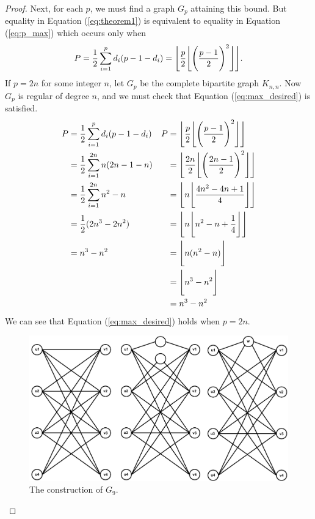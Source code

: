 \documentclass[10pt]{amsart}
\begin{document}
\begin{proof}
    Next, for each $p$, we must find a graph $G_p$ attaining this bound. But equality in Equation 
    (\ref{eq:theorem1}) is equivalent to equality in Equation (\ref{eq:p_max}) which occurs only 
    when
    \begin{equation}
        P = \frac{1}{2} \sum^{p}_{i=1}{d_i(p - 1 - d_i)} 
            = \Bigg \lfloor \frac{p}{2} \Bigg \lfloor  \Bigg \lparen  \frac{p - 1}{2}  \Bigg \rparen^2  \Bigg \rfloor \Bigg \rfloor. \label{eq:max_desired}
    \end{equation}
    If $p=2n$ for some integer $n$, let $G_p$ be the complete bipartite graph $K_{n,n}$. Now $G_p$ 
    is regular of degree $n$, and we must check that Equation (\ref{eq:max_desired}) is satisfied.
    \begin{align*}
        P &= \frac{1}{2} \sum^{p}_{i=1}{d_i(p - 1 - d_i)} & P &= \Bigg \lfloor \frac{p}{2} \Bigg \lfloor  \Bigg \lparen  \frac{p - 1}{2}  \Bigg \rparen^2  \Bigg \rfloor \Bigg \rfloor \notag \\
          &= \frac{1}{2} \sum^{2n}_{i=1}{n(2n - 1 - n)}   &   &= \Bigg \lfloor \frac{2n}{2} \Bigg \lfloor  \Bigg \lparen  \frac{2n - 1}{2}  \Bigg \rparen^2  \Bigg \rfloor \Bigg \rfloor \notag \\
          &= \frac{1}{2} \sum^{2n}_{i=1}{n^2 - n}         &   &= \Bigg \lfloor  n \Bigg \lfloor  \frac{4n^2 - 4n + 1}{4}  \Bigg \rfloor \Bigg \rfloor \notag \\
          &= \frac{1}{2} (2n^3 - 2n^2)                    &   &= \Bigg \lfloor  n \Bigg \lfloor  n^2 - n + \frac{1}{4}  \Bigg \rfloor \Bigg \rfloor \notag \\
          &= n^3 - n^2                                    &   &= \Bigg \lfloor  n(n^2 - n)  \Bigg \rfloor  \notag \\
          &                                               &   &= \Bigg \lfloor  n^3 - n^2  \Bigg \rfloor \notag \\
          &                                               &   &= n^3 - n^2 \notag
    \end{align*}
    We can see that Equation (\ref{eq:max_desired}) holds when $p=2n$.

    \pagebreak

    \begin{figure}[h!]
        \centering
        \includegraphics[scale=.4]{../figures/construction_of_g_p.pdf}
        \caption{The construction of $G_9$.}
        \label{fig:g}
    \end{figure}


\end{proof}
\end{document}
